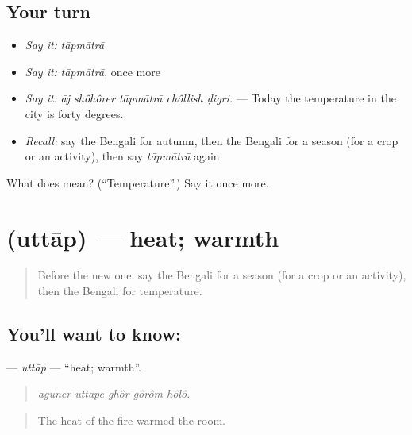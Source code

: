 \subsection*{Your turn}
\begin{itemize}
\raggedright
  \item \emph{Say it:} \emph{tāpmātrā}
  \item \emph{Say it:} \emph{tāpmātrā}, once more
  \item \emph{Say it:} \emph{āj shôhôrer tāpmātrā chôllish ḍigri.} — Today the temperature in the city is forty degrees.
  \item \emph{Recall:} say the Bengali for autumn, then the Bengali for a season (for a crop or an activity), then say \emph{tāpmātrā} again
\end{itemize}

\begin{tcolorbox}[breakable,colback=teal!4,colframe=teal!35!black,title={Before you move on}]
What does  mean? (\textquotedblleft{}Temperature\textquotedblright{}.) Say it once more.
\end{tcolorbox}
\section[\texorpdfstring{\bn{উত্তাপ} (uttāp)}{উত্তাপ (uttāp)}]{ (uttāp) — heat; warmth}

\label{lesson:BN-C427-uttap}



\begin{quote}
Before the new one: say the Bengali for a season (for a crop or an activity), then the Bengali for temperature.
\end{quote}

\subsection*{You'll want to know: }
\textbf{} — \emph{uttāp} — \textquotedblleft{}heat; warmth\textquotedblright{}.

\begin{quote}
    
\end{quote}

\begin{quote}
\emph{āguner uttāpe ghôr gôrôm hôlô.}
\end{quote}

\begin{quote}
The heat of the fire warmed the room.
\end{quote}

